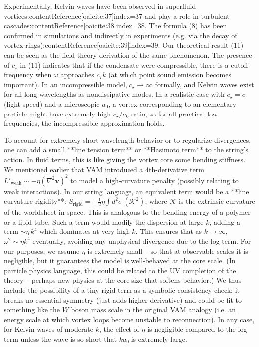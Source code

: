 \documentclass[12pt]{article}
\begin{document}
Experimentally, Kelvin waves have been observed in superfluid vortices:contentReference[oaicite:37]{index=37} and play a role in turbulent cascades:contentReference[oaicite:38]{index=38}. The formula (8) has been confirmed in simulations and indirectly in experiments (e.g. via the decay of vortex rings):contentReference[oaicite:39]{index=39}. Our theoretical result (11) can be seen as the field-theory derivation of the same phenomenon. The presence of $c_\star$ in (11) indicates that if the condensate were compressible, there is a cutoff frequency when $\omega$ approaches $c_\star k$ (at which point sound emission becomes important). In an incompressible model, $c_\star \to \infty$ formally, and Kelvin waves exist for all long wavelengths as nondissipative modes. In a realistic case with $c_\star = c$ (light speed) and a microscopic $a_0$, a vortex corresponding to an elementary particle might have extremely high $c_\star/a_0$ ratio, so for all practical low frequencies, the incompressible approximation holds.

To account for extremely short-wavelength behavior or to regularize divergences, one can add a small **line tension term** or **Hasimoto term** to the string’s action. In fluid terms, this is like giving the vortex core some bending stiffness. We mentioned earlier that VAM introduced a 4th-derivative term $L'_{\text{weak}} \sim -\eta (\nabla^2 \mathbf{v})^2$ to model a high-curvature penalty (possibly relating to weak interactions). In our string language, an equivalent term would be a **line curvature rigidity**: $S_{\text{rigid}} = + \frac{1}{2}\eta \int d^2\sigma\, (\mathcal{K}^2)$, where $\mathcal{K}$ is the extrinsic curvature of the worldsheet in space. This is analogous to the bending energy of a polymer or a lipid tube. Such a term would modify the dispersion at large $k$, adding a term $\sim \eta\, k^4$ which dominates at very high $k$. This ensures that as $k \to \infty$, $\omega^2 \sim \eta k^4$ eventually, avoiding any unphysical divergence due to the log term. For our purposes, we assume $\eta$ is extremely small – so that at observable scales it is negligible, but it guarantees the model is well-behaved at the core scale. (In particle physics language, this could be related to the UV completion of the theory – perhaps new physics at the core size that softens behavior.) We thus include the possibility of a tiny rigid term as a symbolic consistency check: it breaks no essential symmetry (just adds higher derivative) and could be fit to something like the $W$ boson mass scale in the original VAM analogy (i.e. an energy scale at which vortex loops become unstable to reconnection). In any case, for Kelvin waves of moderate $k$, the effect of $\eta$ is negligible compared to the log term unless the wave is so short that $k a_0$ is extremely large. 
\end{document}
